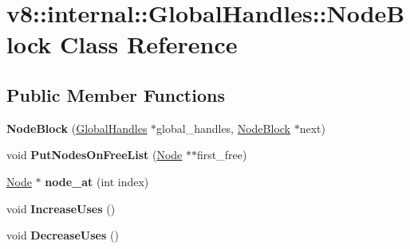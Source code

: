 \hypertarget{classv8_1_1internal_1_1_global_handles_1_1_node_block}{}\section{v8\+:\+:internal\+:\+:Global\+Handles\+:\+:Node\+Block Class Reference}
\label{classv8_1_1internal_1_1_global_handles_1_1_node_block}
\subsection*{Public Member Functions}
\begin{DoxyCompactItemize}
\item 
{\bfseries Node\+Block} (\hyperlink{classv8_1_1internal_1_1_global_handles}{Global\+Handles} $\ast$global\+\_\+handles, \hyperlink{classv8_1_1internal_1_1_global_handles_1_1_node_block}{Node\+Block} $\ast$next)\hypertarget{classv8_1_1internal_1_1_global_handles_1_1_node_block_a6f3f4ad3ad8fc3185ef080d710d900c0}{}\label{classv8_1_1internal_1_1_global_handles_1_1_node_block_a6f3f4ad3ad8fc3185ef080d710d900c0}

\item 
void {\bfseries Put\+Nodes\+On\+Free\+List} (\hyperlink{classv8_1_1internal_1_1_global_handles_1_1_node}{Node} $\ast$$\ast$first\+\_\+free)\hypertarget{classv8_1_1internal_1_1_global_handles_1_1_node_block_afa818cdc0b3346f12e42304c4f358ad3}{}\label{classv8_1_1internal_1_1_global_handles_1_1_node_block_afa818cdc0b3346f12e42304c4f358ad3}

\item 
\hyperlink{classv8_1_1internal_1_1_global_handles_1_1_node}{Node} $\ast$ {\bfseries node\+\_\+at} (int index)\hypertarget{classv8_1_1internal_1_1_global_handles_1_1_node_block_ac98e55ac69269c50d8ecc233e670081c}{}\label{classv8_1_1internal_1_1_global_handles_1_1_node_block_ac98e55ac69269c50d8ecc233e670081c}

\item 
void {\bfseries Increase\+Uses} ()\hypertarget{classv8_1_1internal_1_1_global_handles_1_1_node_block_aaffc8a8a872d639fcdc3376f4cbaac3f}{}\label{classv8_1_1internal_1_1_global_handles_1_1_node_block_aaffc8a8a872d639fcdc3376f4cbaac3f}

\item 
void {\bfseries Decrease\+Uses} ()\hypertarget{classv8_1_1internal_1_1_global_handles_1_1_node_block_ab9a674fa6b8d63412c9933d2f7f81d80}{}\label{classv8_1_1internal_1_1_global_handles_1_1_node_block_ab9a674fa6b8d63412c9933d2f7f81d80}


\end{DoxyCompactItemize}

